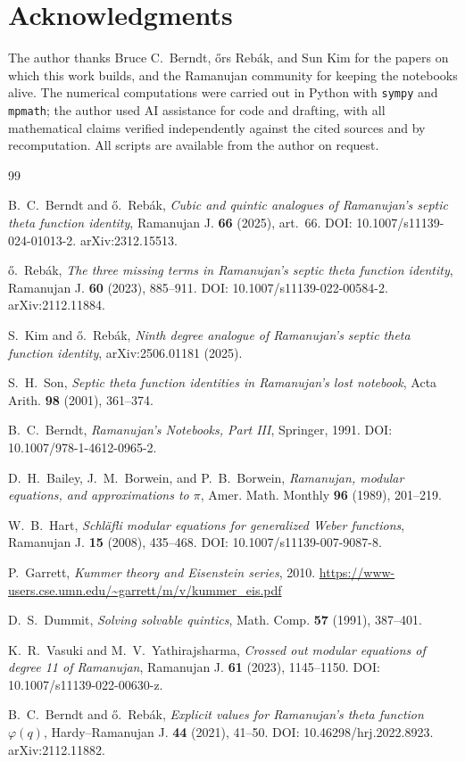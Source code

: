 \documentclass[11pt]{amsart}
\theoremstyle{plain}
\theoremstyle{definition}
\theoremstyle{remark}
\begin{document}
\section*{Acknowledgments}
The author thanks Bruce C.~Berndt, \H{o}rs Reb\'ak, and Sun Kim for the papers on
which this work builds, and the Ramanujan community for keeping the notebooks alive.
The numerical computations were carried out in Python with \texttt{sympy} and
\texttt{mpmath}; the author used AI assistance for code and drafting, with all
mathematical claims verified independently against the cited sources and by
recomputation. All scripts are available from the author on request.

\begin{thebibliography}{99}

 B.~C.~Berndt and \H{o}.~Reb\'ak, \emph{Cubic and quintic analogues of
Ramanujan's septic theta function identity}, Ramanujan J. \textbf{66} (2025), art.~66.
DOI: 10.1007/s11139-024-01013-2. arXiv:2312.15513.

 \H{o}.~Reb\'ak, \emph{The three missing terms in Ramanujan's septic
theta function identity}, Ramanujan J. \textbf{60} (2023), 885--911.
DOI: 10.1007/s11139-022-00584-2. arXiv:2112.11884.

 S.~Kim and \H{o}.~Reb\'ak, \emph{Ninth degree analogue of Ramanujan's
septic theta function identity}, arXiv:2506.01181 (2025).

 S.~H.~Son, \emph{Septic theta function identities in Ramanujan's lost
notebook}, Acta Arith. \textbf{98} (2001), 361--374.

 B.~C.~Berndt, \emph{Ramanujan's Notebooks, Part III}, Springer,
1991. DOI: 10.1007/978-1-4612-0965-2.

 D.~H.~Bailey, J.~M.~Borwein, and P.~B.~Borwein, \emph{Ramanujan,
modular equations, and approximations to $\pi$}, Amer. Math. Monthly \textbf{96}
(1989), 201--219.

 W.~B.~Hart, \emph{Schl\"afli modular equations for generalized Weber
functions}, Ramanujan J. \textbf{15} (2008), 435--468.
DOI: 10.1007/s11139-007-9087-8.

 P.~Garrett, \emph{Kummer theory and Eisenstein series}, 2010.
\url{https://www-users.cse.umn.edu/~garrett/m/v/kummer_eis.pdf}

 D.~S.~Dummit, \emph{Solving solvable quintics}, Math. Comp.
\textbf{57} (1991), 387--401.

 K.~R.~Vasuki and M.~V.~Yathirajsharma, \emph{Crossed out modular
equations of degree 11 of Ramanujan}, Ramanujan J. \textbf{61} (2023), 1145--1150.
DOI: 10.1007/s11139-022-00630-z.

 B.~C.~Berndt and \H{o}.~Reb\'ak, \emph{Explicit values for Ramanujan's
theta function $\varphi(q)$}, Hardy--Ramanujan J. \textbf{44} (2021), 41--50.
DOI: 10.46298/hrj.2022.8923. arXiv:2112.11882.

\end{thebibliography}
\end{document}
